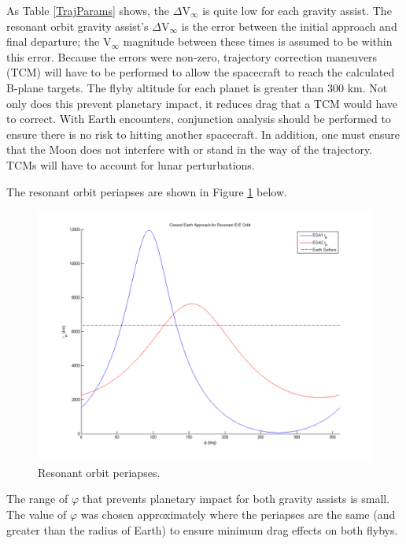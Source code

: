 \documentclass[]{aiaa-tc}%
\begin{document}
As Table \ref{TrajParams} shows, the $\Delta$V$_\infty$ is quite low for each gravity assist. The resonant orbit gravity assist's $\Delta$V$_\infty$ is the error between the initial approach and final departure; the V$_\infty$ magnitude between these times is assumed to be within this error. Because the errors were non-zero, trajectory correction maneuvers (TCM) will have to be performed to allow the spacecraft to reach the calculated B-plane targets. The flyby altitude for each planet is greater than 300 km. Not only does this prevent planetary impact, it reduces drag that a TCM would have to correct. With Earth encounters, conjunction analysis should be performed to ensure there is no risk to hitting another spacecraft. In addition, one must ensure that the Moon does not interfere with or stand in the way of the trajectory. TCMs will have to account for lunar perturbations.
	
	\vspace{5 mm}

The resonant orbit periapses are shown in Figure \ref{fig:reso} below.
	\begin{figure}[H]
		\centering
			\includegraphics[width = 18cm]{../PCP/VEEJ/PhiVsRp.png}
		\caption{Resonant orbit periapses. }
		\label{fig:reso}
	\end{figure}	

The range of $\varphi$ that prevents planetary impact for both gravity assists is small. The value of $\varphi$ was chosen approximately where the periapses are the same (and greater than the radius of Earth) to ensure minimum drag effects on both flybys. 
	
\end{document}
